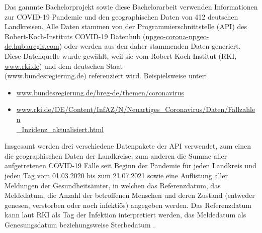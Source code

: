 Das gannnte Bachelorprojekt sowie diese Bachelorarbeit verwenden Informationen zur COVID-19 Pandemie und den geographischen Daten von 412 deutschen Landkreisen. Alle Daten stammen von der Programmierschnittstelle (API) des Robert-Koch-Instituts \glqq{}COVID-19 Datenhub\grqq{}
(\href{npgeo-corona-npgeo-de.hub.arcgis.com}{npgeo-corona-npgeo-de.hub.arcgis.com}) oder werden aus den daher stammenden Daten generiert. Diese Datenquelle wurde gewählt, weil sie vom Robert-Koch-Institut (RKI, \href{www.rki.de}{www.rki.de}) und dem deutschen Staat\\
 (www.bundesregierung.de) referenziert wird. Beispielsweise unter:
\begin{itemize}
    \item \href{www.bundesregierung.de/breg-de/themen/coronavirus}{www.bundesregierung.de/breg-de/themen/coronavirus}
    \item \href{www.rki.de/DE/Content/InfAZ/N/Neuartiges_Coronavirus/Daten/Fallzahlen_Inzidenz_aktualisiert.html}{www.rki.de/DE/Content/InfAZ/N/Neuartiges\_Coronavirus/Daten/Fallzahlen}\\
    \href{www.rki.de/DE/Content/InfAZ/N/Neuartiges_Coronavirus/Daten/Fallzahlen_Inzidenz_aktualisiert.html}{\_Inzidenz\_aktualisiert.html}
\end{itemize}

Insgesamt werden drei verschiedene Datenpakete der API verwendet, zum einen die geographischen Daten der Landkreise, zum anderen die Summe aller aufgetretenen COVID-19 Fälle seit Beginn der Pandemie für jeden Landkreis und jeden Tag vom 01.03.2020 bis zum 21.07.2021 sowie eine Auflistung aller Meldungen der Gesundheitsämter, in welchen das  Referenzdatum, das Meldedatum, die Anzahl der betroffenen Menschen und deren Zustand (entweder genesen, verstorben oder noch infektiös) angegeben werden. Das Referenzdatum kann laut RKI als Tag der Infektion interpretiert werden, das Meldedatum als Genesungsdatum beziehungsweise Sterbedatum \autocite{RKI_Bulletin}.

